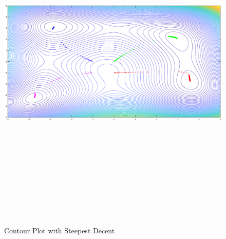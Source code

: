 \documentclass[12pt]{article}
\begin{document}
\begin{landscape}
\begin{figure}[h!]
    \centering
    \includegraphics[width=9in,height=6.5in]{SDM_Contour.eps}
    \caption{Contour Plot with Steepest Decent}
    \label{fig:SDM_Contour}
\end{figure}
\end{landscape}
\pagebreak
\end{document}
